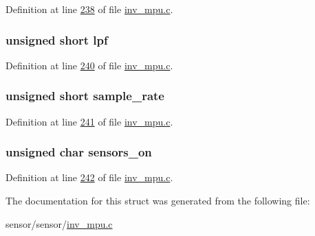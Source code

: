 Definition at line \hyperlink{inv__mpu_8c_source_l00238}{238} of file \hyperlink{inv__mpu_8c_source}{inv\+\_\+mpu.\+c}.

\subsubsection[{\texorpdfstring{lpf}{lpf}}]{\setlength{\rightskip}{0pt plus 5cm}unsigned short lpf}\hypertarget{structmotion__int__cache__s_a0ba1d4e0bb375eb3050352ddef12d25f}{}\label{structmotion__int__cache__s_a0ba1d4e0bb375eb3050352ddef12d25f}


Definition at line \hyperlink{inv__mpu_8c_source_l00240}{240} of file \hyperlink{inv__mpu_8c_source}{inv\+\_\+mpu.\+c}.

\subsubsection[{\texorpdfstring{sample\+\_\+rate}{sample_rate}}]{\setlength{\rightskip}{0pt plus 5cm}unsigned short sample\+\_\+rate}\hypertarget{structmotion__int__cache__s_a1aa4e026c4d2f691506f2d713a405aea}{}\label{structmotion__int__cache__s_a1aa4e026c4d2f691506f2d713a405aea}


Definition at line \hyperlink{inv__mpu_8c_source_l00241}{241} of file \hyperlink{inv__mpu_8c_source}{inv\+\_\+mpu.\+c}.

\subsubsection[{\texorpdfstring{sensors\+\_\+on}{sensors_on}}]{\setlength{\rightskip}{0pt plus 5cm}unsigned char sensors\+\_\+on}\hypertarget{structmotion__int__cache__s_a90574f8e8515ef8fee3114ba7e0ddc5c}{}\label{structmotion__int__cache__s_a90574f8e8515ef8fee3114ba7e0ddc5c}


Definition at line \hyperlink{inv__mpu_8c_source_l00242}{242} of file \hyperlink{inv__mpu_8c_source}{inv\+\_\+mpu.\+c}.



The documentation for this struct was generated from the following file\+:\begin{DoxyCompactItemize}
\item 
sensor/sensor/\hyperlink{inv__mpu_8c}{inv\+\_\+mpu.\+c}\end{DoxyCompactItemize}
